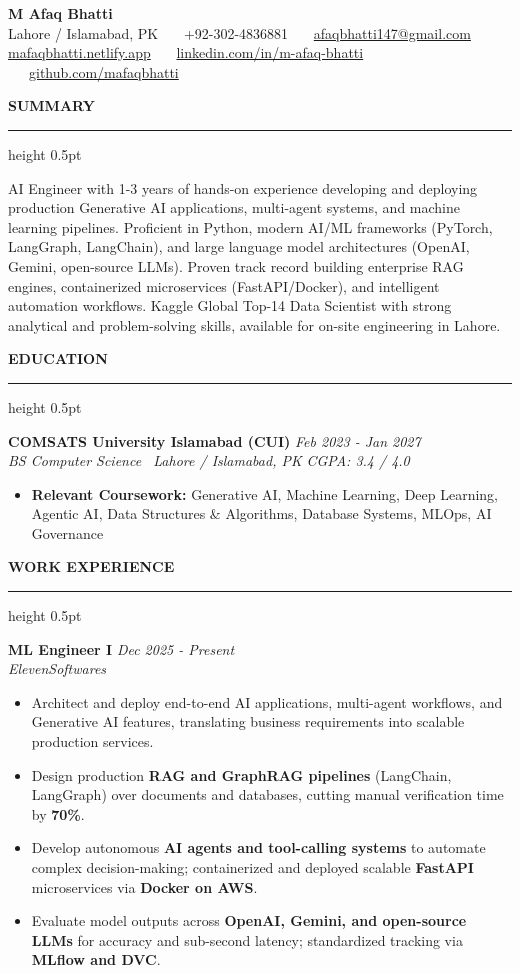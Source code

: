 \documentclass[10pt,letterpaper]{article}
\newcommand{\resumesection}[1]{%
  \vspace{3.5pt}%
  {\fontsize{10.5pt}{12pt}\selectfont\textbf{\MakeUppercase{#1}}}%
  \vspace{1.5pt}%
  \hrule height 0.5pt%
  \vspace{2.5pt}%
}
\begin{document}
\begin{center}
  {\fontsize{18pt}{20pt}\selectfont\textbf{M Afaq Bhatti}}\\[3pt]
  {\fontsize{9pt}{11pt}\selectfont Lahore / Islamabad, PK \ \textbar\ \ +92-302-4836881 \ \textbar\ \ \href{mailto:afaqbhatti147@gmail.com}{afaqbhatti147@gmail.com}}\\[2pt]
  {\fontsize{9pt}{11pt}\selectfont \href{https://mafaqbhatti.netlify.app/}{mafaqbhatti.netlify.app} \ \textbar\ \ \href{https://www.linkedin.com/in/m-afaq-bhatti/}{linkedin.com/in/m-afaq-bhatti} \ \textbar\ \ \href{https://github.com/mafaqbhatti}{github.com/mafaqbhatti}}
\end{center}
\vspace{-6pt}

\resumesection{Summary}
AI Engineer with 1-3 years of hands-on experience developing and deploying production Generative AI applications, multi-agent systems, and machine learning pipelines. Proficient in Python, modern AI/ML frameworks (PyTorch, LangGraph, LangChain), and large language model architectures (OpenAI, Gemini, open-source LLMs). Proven track record building enterprise RAG engines, containerized microservices (FastAPI/Docker), and intelligent automation workflows. Kaggle Global Top-14 Data Scientist with strong analytical and problem-solving skills, available for on-site engineering in Lahore.

\resumesection{Education}
\noindent\textbf{COMSATS University Islamabad (CUI)} \hfill \textit{Feb 2023 - Jan 2027} \\
\textit{BS Computer Science \textbar\ Lahore / Islamabad, PK} \hfill \textit{CGPA: 3.4 / 4.0}
\begin{itemize}
  \item \textbf{Relevant Coursework:} Generative AI, Machine Learning, Deep Learning, Agentic AI, Data Structures \& Algorithms, Database Systems, MLOps, AI Governance
\end{itemize}

\resumesection{Work Experience}
\noindent\textbf{ML Engineer I} \hfill \textit{Dec 2025 - Present} \\
\textit{ElevenSoftwares}
\begin{itemize}
  \item Architect and deploy end-to-end AI applications, multi-agent workflows, and Generative AI features, translating business requirements into scalable production services.
  \item Design production \textbf{RAG and GraphRAG pipelines} (LangChain, LangGraph) over documents and databases, cutting manual verification time by \textbf{70\%}.
  \item Develop autonomous \textbf{AI agents and tool-calling systems} to automate complex decision-making; containerized and deployed scalable \textbf{FastAPI} microservices via \textbf{Docker on AWS}.
  \item Evaluate model outputs across \textbf{OpenAI, Gemini, and open-source LLMs} for accuracy and sub-second latency; standardized tracking via \textbf{MLflow and DVC}.
\end{itemize}
\end{document}
